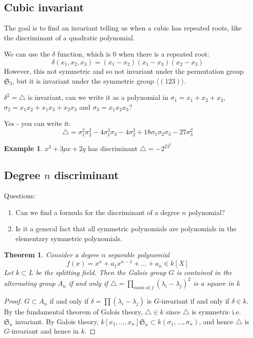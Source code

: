 \documentclass{article}
\theoremstyle{definition}
\newtheorem{exmp}{Example}[section]
\theoremstyle{plain}%
\newtheorem{thm}{Theorem}[section]
\theoremstyle{remark}
\begin{document}
\subsection{Cubic invariant}

The goal is to find an invariant telling us when a cubic has repeated roots, like the discriminant of a quadratic polynomial.

We can use the $\delta$ function, which is 0 when there is a repeated root:
\[\delta(x_1, x_2, x_3) = (x_1 - x_2)(x_1 - x_3)(x_2 - x_3)\]
However, this not symmetric and so not invariant under the permutation group $\mathfrak{S}_3$, but it is invariant under the symmetric group $\langle (1 2 3) \rangle$.

$\delta^2 = \triangle$ is invariant, can we write it as a polynomial in $\sigma_1 = x_1 + x_2 + x_3$, $\sigma_2 = x_1x_2 + x_1x_3 + x_2x_3$ and $\sigma_3 = x_1x_2x_3$?

Yes - you can write it:
\[\triangle = \sigma_1^2\sigma_2^2 - 4\sigma_1^3\sigma_3 - 4\sigma_2^3 + 18\sigma_1\sigma_2\sigma_3 - 27\sigma_3^2\]

\begin{exmp}
    $x^3 + 3px + 2q$ has discriminant $\triangle = -2^23^3$ 
\end{exmp}

\subsection{Degree $n$ discriminant}

Questions:
\begin{enumerate}
    \item Can we find a formula for the discriminant of a degree $n$ polynomial?
    \item Is it a general fact that all symmetric polynomials are polynomials in the elementary symmetric polynomials.
\end{enumerate}


\begin{thm}
    Consider a degree $n$ separable polynomial
\[f(x) = x^n + a_1 x^{n-1} + ... + a_n \in k[X]\]
Let $k \subset L$ be the splitting field. Then the Galois group $G$ is contained in the alternating group $A_n$ if and only if $\triangle = \prod_{\text{roots of }f}(\lambda_i - \lambda_j)^2$ is a square in $k$
\end{thm}

\begin{proof}
    $G \subset A_n$ if and only if $\delta = \prod (\lambda_i - \lambda_j)$ is $G$-invariant if and only if $\delta \in k$. By the fundamental theorem of Galois theory, $\triangle \in k$ since $\triangle$ is symmetric i.e. $\mathfrak{S}_n$ invariant. By Galois theory, $k[x_1, ..., x_n]\mathfrak{S}_n \subset k(\sigma_1, ..., \sigma_n)$, and hence $\triangle$ is $G$-invariant and hence in $k$.
\end{proof}
\end{document}
